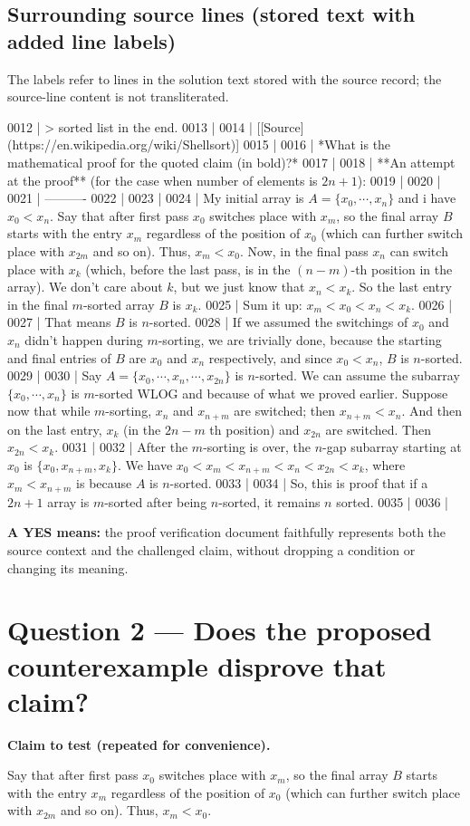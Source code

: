 \documentclass[11pt]{article}
\begin{document}
\subsection*{Surrounding source lines (stored text with added line labels)}
The labels refer to lines in the solution text stored with the source record; the source-line content is not transliterated.
\begin{Vsrc}
0012 | > sorted list in the end.
0013 | 
0014 | [[Source](https://en.wikipedia.org/wiki/Shellsort)]
0015 | 
0016 | *What is the mathematical proof for the quoted claim (in bold)?*
0017 | 
0018 | **An attempt at the proof** (for the case when number of elements is $2n+1$):
0019 | 
0020 | 
0021 | ----------
0022 | 
0023 | 
0024 | My initial array is $A = \{x_0, \cdots, x_n\}$ and i have $x_0 < x_n$. Say that after first pass $x_0$ switches place with $x_m$, so the final array $B$ starts with the entry $x_m$ regardless of the position of $x_0$ (which can further switch place with $x_{2m}$ and so on). Thus, $x_m < x_0$. Now, in the final pass $x_n$ can switch place with $x_k$ (which, before the last pass, is in the $(n-m)$-th position in the array). We don't care about $k$, but we just know that $x_n < x_k$. So the last entry in the final $m$-sorted array $B$ is $x_k$.
0025 | Sum it up: $x_m < x_0 < x_n < x_k$.
0026 | 
0027 | That means $B$ is $n$-sorted.
0028 | If we assumed the switchings of $x_0$ and $x_n$ didn't happen during $m$-sorting, we are trivially done, because the starting and final entries of $B$ are $x_0$ and $x_n$ respectively, and since $x_0 < x_n$, $B$ is $n$-sorted.
0029 | 
0030 | Say $A = \{x_0, \cdots, x_n, \cdots, x_{2n}\}$ is $n$-sorted. We can assume the subarray $\{x_0, \cdots, x_n\}$ is $m$-sorted WLOG and because of what we proved earlier. Suppose now that while $m$-sorting, $x_n$ and $x_{n+m}$ are switched; then $x_{n+m} < x_n$. And then on the last entry, $x_k$ (in the $2n-m$ th position) and $x_{2n}$ are switched. Then $x_{2n} < x_k$.
0031 | 
0032 | After the $m$-sorting is over, the $n$-gap subarray starting at $x_0$ is $\{x_0, x_{n+m}, x_k\}$. We have $x_0 < x_m < x_{n+m} < x_n < x_{2n} < x_k$, where $x_m < x_{n+m}$ is because $A$ is $n$-sorted.
0033 | 
0034 | So, this is proof that if a $2n+1$ array is $m$-sorted after being $n$-sorted, it remains $n$ sorted.
0035 | 
0036 | 
\end{Vsrc}
\textbf{A YES means:} the proof verification document faithfully represents both the source context and the challenged claim, without dropping a condition or changing its meaning.
\section*{Question 2 --- Does the proposed counterexample disprove that claim?}
\textbf{Claim to test (repeated for convenience).}
\begin{Vsrc}
Say that after first pass $x_0$ switches place with $x_m$, so the final array $B$ starts with the entry $x_m$ regardless of the position of $x_0$ (which can further switch place with $x_{2m}$ and so on). Thus, $x_m < x_0$.
\end{Vsrc}
\end{document}
